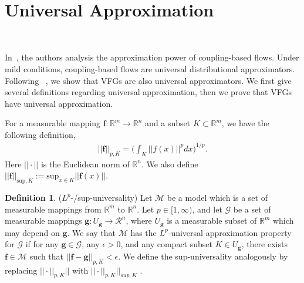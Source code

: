 \documentclass[sigconf, anonymous, review]{acmart}
\theoremstyle{plain}
\theoremstyle{definition}
\newtheorem{definition}[theorem]{Definition}
\theoremstyle{remark}
\begin{document}


\




\section{Universal Approximation}~\label{sec:univ_approx}

In~\cite{Takeshi2020}, the authors analysis the approximation power of coupling-based flows. Under mild conditions,  coupling-based flows are universal distributional approximators. Following ~\cite{Takeshi2020}, we show that VFGs are also universal approximators. We first give several definitions regarding universal approximation, then we prove that VFGs have universal approximation. 




For a measurable mapping $\mathbf{f}: \mathbb{R}^m \rightarrow  \mathbb{R}^n$ and a subset $K \subset   \mathbb{R}^m $,
we have the following definition,
\begin{align*} 
|| \mathbf{f}||_{p,K}= \bigg(\int_{K} ||f(x)||^p dx \bigg)^{1/p}.
\end{align*}
Here $||\cdot||$ is the Euclidean norm of $\mathbb{R}^n$. We also define $||\mathbf{f}||_{\text{sup},K} := \text{sup}_{x\in K} || \mathbf{f}(x)||$. 

\begin{definition}
($L^p$-/sup-universality) Let $\mathcal{M}$ be a model which is a set of measurable mappings from $\mathbb{R}^m$ to $\mathbb{R}^n$. Let $p\in [1, \infty)$, and let $\mathcal{G}$ be  a set of measurable mappings $\mathbf{g}: U_{\mathbf{g}} \rightarrow \mathcal{R}^n$, where $U_{\mathbf{g}}$ is a measurable subset of $\mathbb{R}^m$ which may depend on $\mathbf{g}$. We say that $\mathcal{M}$ has the $L^p$-universal approximation property for $\mathcal{G}$ if for any $\mathbf{g}\in \mathcal{G}$, any $\epsilon > 0$, and any compact subset $K \in U_{\mathbf{g}}$, there exists  $\mathbf{f} \in \mathcal{M}$ such that $|| \mathbf{f}-\mathbf{g}||_{p, K} < \epsilon$. We define the sup-universality analogously by replacing  $|| \cdot ||_{p, K}||$ with $|| \cdot ||_{p, K}||_{sup, K}$ .
\end{definition}
\end{document}
